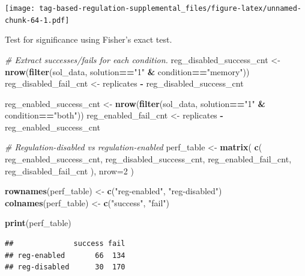 \documentclass[
]{book}
\newenvironment{Shaded}{\begin{snugshade}}{\end{snugshade}}
\newcommand{\CommentTok}[1]{\textcolor[rgb]{0.56,0.35,0.01}{\textit{#1}}}
\newcommand{\DataTypeTok}[1]{\textcolor[rgb]{0.13,0.29,0.53}{#1}}
\newcommand{\DecValTok}[1]{\textcolor[rgb]{0.00,0.00,0.81}{#1}}
\newcommand{\KeywordTok}[1]{\textcolor[rgb]{0.13,0.29,0.53}{\textbf{#1}}}
\newcommand{\NormalTok}[1]{#1}
\newcommand{\OperatorTok}[1]{\textcolor[rgb]{0.81,0.36,0.00}{\textbf{#1}}}
\newcommand{\StringTok}[1]{\textcolor[rgb]{0.31,0.60,0.02}{#1}}
\begin{document}
\texttt{[image: tag-based-regulation-supplemental\_files/figure-latex/unnamed-chunk-64-1.pdf]}

Test for significance using Fisher's exact test.

\begin{Shaded}
\begin{Highlighting}[]
\CommentTok{\# Extract successes/fails for each condition.}
\NormalTok{reg\_disabled\_success\_cnt \textless{}{-}}\StringTok{ }\KeywordTok{nrow}\NormalTok{(}\KeywordTok{filter}\NormalTok{(sol\_data, solution}\OperatorTok{==}\StringTok{"1"} \OperatorTok{\&}\StringTok{ }\NormalTok{condition}\OperatorTok{==}\StringTok{"memory"}\NormalTok{))}
\NormalTok{reg\_disabled\_fail\_cnt \textless{}{-}}\StringTok{ }\NormalTok{replicates }\OperatorTok{{-}}\StringTok{ }\NormalTok{reg\_disabled\_success\_cnt}

\NormalTok{reg\_enabled\_success\_cnt \textless{}{-}}\StringTok{ }\KeywordTok{nrow}\NormalTok{(}\KeywordTok{filter}\NormalTok{(sol\_data, solution}\OperatorTok{==}\StringTok{"1"} \OperatorTok{\&}\StringTok{ }\NormalTok{condition}\OperatorTok{==}\StringTok{"both"}\NormalTok{))}
\NormalTok{reg\_enabled\_fail\_cnt \textless{}{-}}\StringTok{ }\NormalTok{replicates }\OperatorTok{{-}}\StringTok{ }\NormalTok{reg\_enabled\_success\_cnt}

\CommentTok{\# Regulation{-}disabled vs regulation{-}enabled}
\NormalTok{perf\_table \textless{}{-}}\StringTok{ }\KeywordTok{matrix}\NormalTok{(}
  \KeywordTok{c}\NormalTok{(}
\NormalTok{    reg\_enabled\_success\_cnt,}
\NormalTok{    reg\_disabled\_success\_cnt,}
\NormalTok{    reg\_enabled\_fail\_cnt,}
\NormalTok{    reg\_disabled\_fail\_cnt}
\NormalTok{    ),}
    \DataTypeTok{nrow=}\DecValTok{2}
\NormalTok{)}

\KeywordTok{rownames}\NormalTok{(perf\_table) \textless{}{-}}\StringTok{ }\KeywordTok{c}\NormalTok{(}\StringTok{"reg{-}enabled"}\NormalTok{, }\StringTok{"reg{-}disabled"}\NormalTok{)}
\KeywordTok{colnames}\NormalTok{(perf\_table) \textless{}{-}}\StringTok{ }\KeywordTok{c}\NormalTok{(}\StringTok{"success"}\NormalTok{, }\StringTok{"fail"}\NormalTok{)}

\KeywordTok{print}\NormalTok{(perf\_table)}
\end{Highlighting}
\end{Shaded}

\begin{verbatim}
##              success fail
## reg-enabled       66  134
## reg-disabled      30  170
\end{verbatim}
\end{document}
